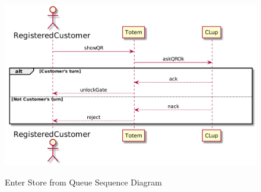 \begin{figure}[H]
    \centering
    \includegraphics[width=1\textwidth]{uml/enter_queue.png}
    \label{fig:seqdiag-enter_queue}
    \caption{Enter Store from Queue Sequence Diagram}
\end{figure}

